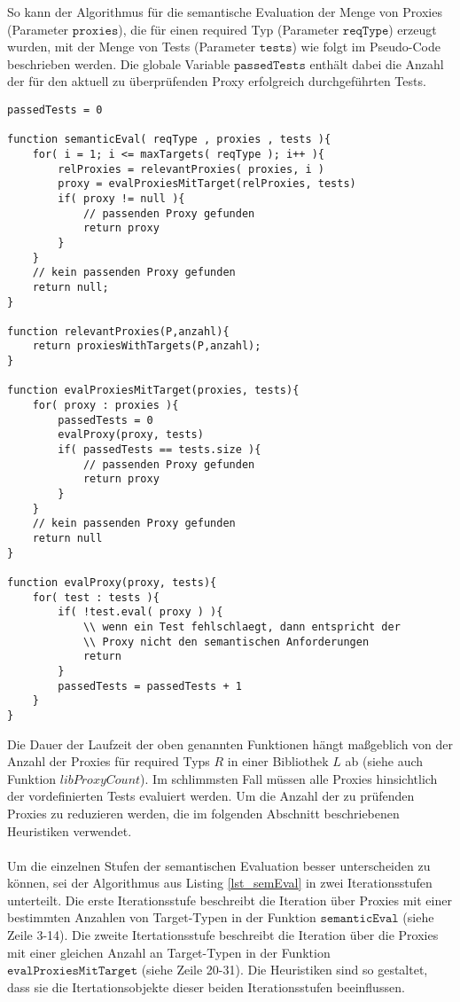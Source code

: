 \documentclass[a4paper,12pt]{article}
\begin{document}
\noindent
So kann der Algorithmus für die semantische Evaluation der Menge von Proxies (Parameter $\texttt{proxies}$), die für einen required Typ (Parameter $\texttt{reqType}$) erzeugt wurden, mit der Menge von Tests (Parameter $\texttt{tests}$) wie folgt im Pseudo-Code beschrieben werden. Die globale Variable $\texttt{passedTests}$ enthält dabei die Anzahl der für den aktuell zu überprüfenden Proxy erfolgreich durchgeführten Tests.
\begin{lstlisting}[style = pseudo, caption = Semantische Evaluation ohne Heuristiken, captionpos = b, label = lst_semEval]
passedTests = 0

function semanticEval( reqType , proxies , tests ){
	for( i = 1; i <= maxTargets( reqType ); i++ ){
		relProxies = relevantProxies( proxies, i )
		proxy = evalProxiesMitTarget(relProxies, tests)	
		if( proxy != null ){
			// passenden Proxy gefunden
			return proxy
		}
	}
	// kein passenden Proxy gefunden
	return null;
}

function relevantProxies(P,anzahl){
	return proxiesWithTargets(P,anzahl);
}

function evalProxiesMitTarget(proxies, tests){
	for( proxy : proxies ){
		passedTests = 0
		evalProxy(proxy, tests)
		if( passedTests == tests.size ){
			// passenden Proxy gefunden
			return proxy
		}
	}
	// kein passenden Proxy gefunden
	return null
}

function evalProxy(proxy, tests){
	for( test : tests ){
		if( !test.eval( proxy ) ){
			\\ wenn ein Test fehlschlaegt, dann entspricht der 
			\\ Proxy nicht den semantischen Anforderungen
			return
		}
		passedTests = passedTests + 1
	}
}
\end{lstlisting}
Die Dauer der Laufzeit der oben genannten Funktionen hängt maßgeblich von der Anzahl der Proxies für required Typs $R$ in einer Bibliothek $L$ ab (siehe auch Funktion $\mathit{libProxyCount}$). Im schlimmsten Fall müssen alle Proxies hinsichtlich der vordefinierten Tests evaluiert werden. Um die Anzahl der zu prüfenden Proxies zu reduzieren werden, die im folgenden Abschnitt beschriebenen Heuristiken verwendet.
\\\\
Um die einzelnen Stufen der semantischen Evaluation besser unterscheiden zu können, sei der Algorithmus aus Listing \ref{lst_semEval} in zwei Iterationsstufen unterteilt. Die erste Iterationsstufe beschreibt die Iteration über Proxies mit einer bestimmten Anzahlen von Target-Typen in der Funktion $\texttt{semanticEval}$ (siehe Zeile 3-14). Die zweite Itertationsstufe beschreibt die Iteration über die Proxies mit einer gleichen Anzahl an Target-Typen in der Funktion $\texttt{evalProxiesMitTarget}$ (siehe Zeile 20-31). Die Heuristiken sind so gestaltet, dass sie die Itertationsobjekte dieser beiden Iterationsstufen beeinflussen.
\end{document}
